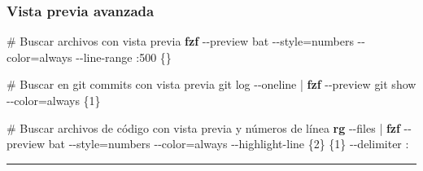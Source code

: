 \documentclass[
  11pt,
  letterpaper,
  oneside,
  openany]{scrbook}
\newenvironment{Shaded}{}{}
\newcommand{\AttributeTok}[1]{\textcolor[rgb]{0.84,0.23,0.29}{#1}}
\newcommand{\BuiltInTok}[1]{\textcolor[rgb]{0.84,0.23,0.29}{#1}}
\newcommand{\CommentTok}[1]{\textcolor[rgb]{0.42,0.45,0.49}{#1}}
\newcommand{\ControlFlowTok}[1]{\textcolor[rgb]{0.84,0.23,0.29}{#1}}
\newcommand{\ExtensionTok}[1]{\textcolor[rgb]{0.84,0.23,0.29}{\textbf{#1}}}
\newcommand{\FunctionTok}[1]{\textcolor[rgb]{0.44,0.26,0.76}{#1}}
\newcommand{\KeywordTok}[1]{\textcolor[rgb]{0.84,0.23,0.29}{#1}}
\newcommand{\NormalTok}[1]{\textcolor[rgb]{0.14,0.16,0.18}{#1}}
\newcommand{\OperatorTok}[1]{\textcolor[rgb]{0.14,0.16,0.18}{#1}}
\newcommand{\OtherTok}[1]{\textcolor[rgb]{0.44,0.26,0.76}{#1}}
\newcommand{\StringTok}[1]{\textcolor[rgb]{0.01,0.18,0.38}{#1}}
\newcommand{\VariableTok}[1]{\textcolor[rgb]{0.89,0.38,0.04}{#1}}
\begin{document}
\begin{Shaded}
\end{Shaded}

\subsubsection{Vista previa avanzada}\label{vista-previa-avanzada}

\begin{Shaded}
\begin{Highlighting}[]
\CommentTok{\# Buscar archivos con vista previa}
\ExtensionTok{fzf} \AttributeTok{{-}{-}preview} \StringTok{\textquotesingle{}bat {-}{-}style=numbers {-}{-}color=always {-}{-}line{-}range :500 \{\}\textquotesingle{}}

\CommentTok{\# Buscar en git commits con vista previa}
\FunctionTok{git}\NormalTok{ log }\AttributeTok{{-}{-}oneline} \KeywordTok{|} \ExtensionTok{fzf} \AttributeTok{{-}{-}preview} \StringTok{\textquotesingle{}git show {-}{-}color=always \{1\}\textquotesingle{}}

\CommentTok{\# Buscar archivos de código con vista previa y números de línea}
\ExtensionTok{rg} \AttributeTok{{-}{-}files} \KeywordTok{|} \ExtensionTok{fzf} \AttributeTok{{-}{-}preview} \StringTok{\textquotesingle{}bat {-}{-}style=numbers {-}{-}color=always {-}{-}highlight{-}line \{2\} \{1\}\textquotesingle{}} \AttributeTok{{-}{-}delimiter} \StringTok{\textquotesingle{}:\textquotesingle{}}
\end{Highlighting}
\end{Shaded}

\begin{center}\rule{0.5\linewidth}{0.5pt}\end{center}
\end{document}
